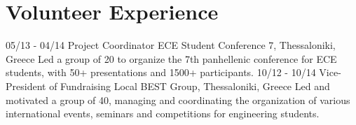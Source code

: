 \documentclass[]{friggeri-cv}
\begin{document}
\section{Volunteer Experience}
\vspace{-\parsep}
\begin{entrylist}
	\entry
	{05/13 - 04/14}
	{Project Coordinator}
	{ECE Student Conference 7, Thessaloniki, Greece}
	{Led a group of 20 to organize the 7th panhellenic conference for ECE students, with 50+ presentations and 1500+ participants.}
  \entry
    {10/12 - 10/14}
    {Vice-President of Fundraising}
    {Local BEST Group, Thessaloniki, Greece}
    {Led and motivated a group of 40, managing and coordinating the organization of various international events, seminars and competitions for engineering students. }
\end{entrylist}

%
\end{document}
